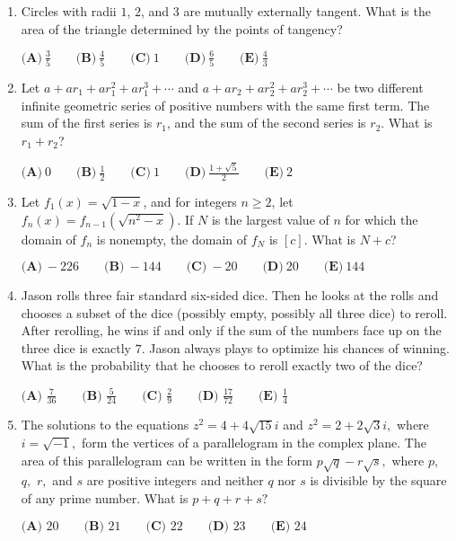 \documentclass{article}%
\begin{document}
\begin{enumerate}
%
\item%
Circles with radii $1$, $2$, and $3$ are mutually externally tangent. What is the area of the triangle determined by the points of tangency?

$\textbf{(A)}\ \frac{3}{5} \qquad \textbf{(B)}\ \frac{4}{5} \qquad \textbf{(C)}\ 1 \qquad \textbf{(D)}\ \frac{6}{5} \qquad \textbf{(E)}\ \frac{4}{3}$

%
\item%
Let $a + ar_1 + ar_1^2 + ar_1^3 + \cdots$ and $a + ar_2 + ar_2^2 + ar_2^3 + \cdots$ be two different infinite geometric series of positive numbers with the same first term.  The sum of the first series is $r_1$, and the sum of the second series is $r_2$.  What is $r_1 + r_2$?

$\textbf{(A)}\ 0\qquad \textbf{(B)}\ \frac {1}{2}\qquad \textbf{(C)}\ 1\qquad \textbf{(D)}\ \frac {1 + \sqrt {5}}{2}\qquad \textbf{(E)}\ 2$

%
\item%
Let $f_{1}(x)=\sqrt{1-x}$, and for integers $n \geq 2$, let $f_{n}(x)=f_{n-1}(\sqrt{n^2 - x})$. If $N$ is the largest value of $n$ for which the domain of $f_{n}$ is nonempty, the domain of $f_{N}$ is $[c]$. What is $N+c$?

$\textbf{(A)}\ -226 \qquad \textbf{(B)}\ -144 \qquad \textbf{(C)}\ -20 \qquad \textbf{(D)}\ 20 \qquad \textbf{(E)}\ 144$

%
\item%
Jason rolls three fair standard six-sided dice. Then he looks at the rolls and chooses a subset of the dice (possibly empty, possibly all three dice) to reroll. After rerolling, he wins if and only if the sum of the numbers face up on the three dice is exactly $7.$ Jason always plays to optimize his chances of winning. What is the probability that he chooses to reroll exactly two of the dice?

$\textbf{(A) } \frac{7}{36} \qquad\textbf{(B) } \frac{5}{24} \qquad\textbf{(C) } \frac{2}{9} \qquad\textbf{(D) } \frac{17}{72} \qquad\textbf{(E) } \frac{1}{4}$

%
\item%
The solutions to the equations $z^2=4+4\sqrt{15}i$ and $z^2=2+2\sqrt 3i,$ where $i=\sqrt{-1},$ form the vertices of a parallelogram in the complex plane. The area of this parallelogram can be written in the form $p\sqrt q-r\sqrt s,$ where $p,$ $q,$ $r,$ and $s$ are positive integers and neither $q$ nor $s$ is divisible by the square of any prime number. What is $p+q+r+s?$

$\textbf{(A) } 20 \qquad  \textbf{(B) } 21 \qquad  \textbf{(C) } 22 \qquad  \textbf{(D) } 23 \qquad  \textbf{(E) } 24$


\end{enumerate}
\end{document}
